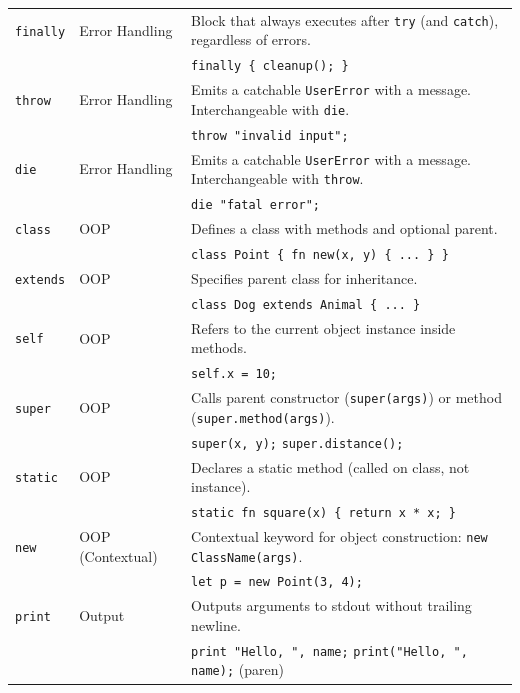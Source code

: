 \begin{longtable}{@{}llp{8cm}@{}}
\texttt{finally} & Error Handling &
Block that always executes after \texttt{try} (and \texttt{catch}), regardless of errors.\\
& & \texttt{finally \{ cleanup(); \}} \\

\texttt{throw} & Error Handling &
Emits a catchable \texttt{UserError} with a message. Interchangeable with \texttt{die}.\\
& & \texttt{throw "invalid input";} \\

\texttt{die} & Error Handling &
Emits a catchable \texttt{UserError} with a message. Interchangeable with \texttt{throw}.\\
& & \texttt{die "fatal error";} \\

\texttt{class} & OOP &
Defines a class with methods and optional parent.\\
& & \texttt{class Point \{ fn new(x, y) \{ ... \} \}} \\

\texttt{extends} & OOP &
Specifies parent class for inheritance.\\
& & \texttt{class Dog extends Animal \{ ... \}} \\

\texttt{self} & OOP &
Refers to the current object instance inside methods.\\
& & \texttt{self.x = 10;} \\

\texttt{super} & OOP &
Calls parent constructor (\texttt{super(args)}) or method (\texttt{super.method(args)}).\\
& & \texttt{super(x, y);} \hspace{1em} \texttt{super.distance();} \\

\texttt{static} & OOP &
Declares a static method (called on class, not instance).\\
& & \texttt{static fn square(x) \{ return x * x; \}} \\

\texttt{new} & OOP (Contextual) &
Contextual keyword for object construction: \texttt{new ClassName(args)}.\\
& & \texttt{let p = new Point(3, 4);} \\

\texttt{print} & Output &
Outputs arguments to stdout without trailing newline.\\
& & \texttt{print "Hello, ", name;} \hspace{1em} \texttt{print("Hello, ", name);} (paren) \\


\end{longtable}
